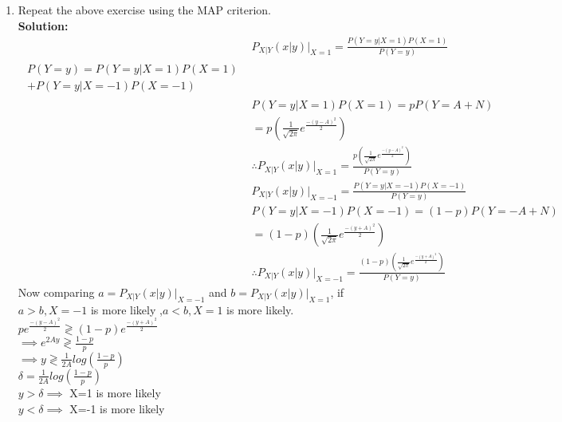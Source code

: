 \documentclass[journal,12pt,twocolumn]{IEEEtran}
\renewcommand\thesection{\arabic{section}}
\providecommand{\brak}[1]{\ensuremath{\left(#1\right)}}
\theoremstyle{remark}
\newcommand{\solution}{\noindent \textbf{Solution: }}
\numberwithin{equation}{section}
\begin{document}
\begin{enumerate}[label=\thesection.\arabic*
,ref=\thesection.\theenumi]
\item Repeat the above exercise using the MAP criterion. \\
\solution
\begin{align}
&P_{X|Y}\brak{x|y} \big|_{X=1}= \frac{P(Y=y|X=1)P(X=1)}{P(Y=y)}\\
\begin{split}P(Y=y)=P(Y=y|X=1)P(X=1)\\+P(Y=y|X=-1)P(X=-1)\end{split}\\
&P(Y=y|X=1)P(X=1)=p P(Y=A+N)\\
&=p\brak{\frac{1}{\sqrt{2 \pi}} e^{\frac{-(y-A)^2}{2}}}\\
&\therefore P_{X|Y}(x|y) \big|_{X=1}=\frac{p\brak{\frac{1}{\sqrt{2 \pi}} e^{\frac{-(y-A)^2}{2}}}}{P(Y=y)}\\
&P_{X|Y}(x|y) \big|_{X=-1}= \frac{P(Y=y|X=-1)P(X=-1)}{P(Y=y)}\\
&P(Y=y|X=-1)P(X=-1)=(1-p) P(Y=-A+N)\nonumber\\
&=(1-p)\brak{\frac{1}{\sqrt{2 \pi}} e^{\frac{-(y+A)^2}{2}}}\\
&\therefore P_{X|Y}(x|y) \big|_{X=-1}=\frac{(1-p)\brak{\frac{1}{\sqrt{2\pi}} e^{\frac{-(y+A)^2}{2}}}}{P(Y=y)}
\end{align}
Now comparing $a=P_{X|Y}(x|y) \big|_{X=-1}$ and $b=P_{X|Y}(x|y) \big|_{X=1}$, if $a>b, X=-1$ is more likely ,$a<b, X=1$ is more likely.\\
$p e^{\frac{-(y-A)^2}{2}}\gtrless(1-p)e^{\frac{-(y+A)^2}{2}}$\\
$\implies e^{2Ay}\gtrless\frac{1-p}{p}$\\
$\implies y\gtrless\frac{1}{2A}log\brak{\frac{1-p}{p}}$\\
$\delta=\frac{1}{2A}log\brak{\frac{1-p}{p}}$\\
$y>\delta \implies$ X=1 is more likely\\
$y<\delta \implies$ X=-1 is more likely
		\end{enumerate}
		
\end{document}
